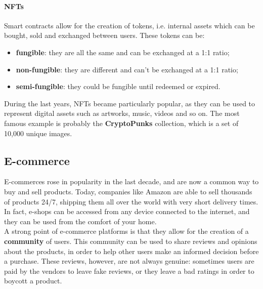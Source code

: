 \documentclass[12pt,a4paper,oneside]{article}
\theoremstyle{definition}
\begin{document}
\paragraph{NFTs} Smart contracts allow for the creation of tokens, i.e. internal assets which can be bought, sold and exchanged between users. These tokens can be:
\begin{itemize}
	\item \textbf{fungible}: they are all the same and can be exchanged at a 1:1 ratio;
	\item \textbf{non-fungible}: they are different and can't be exchanged at a 1:1 ratio;
	\item \textbf{semi-fungible}: they could be fungible until redeemed or expired.
\end{itemize}
During the last years, NFTs became particularly popular, as they can be used to represent digital assets such as artworks, music, videos and so on. The most famous example is probably the \textbf{CryptoPunks} collection, which is a set of 10,000 unique images.\\


\subsection{E-commerce}

E-commerces rose in popularity in the last decade, and are now a common way to buy and sell products. Today, companies like Amazon are able to sell thousands of products 24/7, shipping them all over the world with very short delivery times. In fact, e-shops can be accessed from any device connected to the internet, and they can be used from the comfort of your home. \\
A strong point of e-commerce platforms is that they allow for the creation of a \textbf{community} of users. This community can be used to share reviews and opinions about the products, in order to help other users make an informed decision before a purchase. These reviews, however, are not always genuine: sometimes users are paid by the vendors to leave fake reviews, or they leave a bad ratings in order to boycott a product. \\
\end{document}
